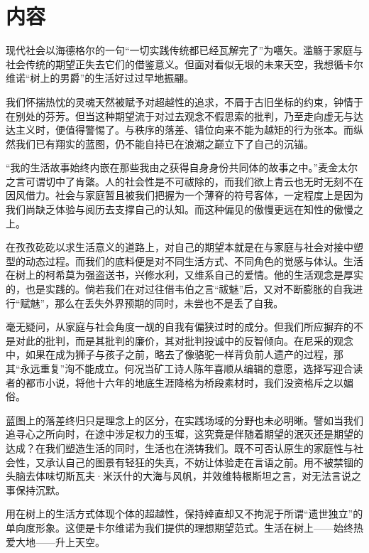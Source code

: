 \documentclass{cv}
\begin{document}
\section[\faTree]{内容}

现代社会以海德格尔的一句“一切实践传统都已经瓦解完了”为嚆矢。滥觞于家庭与社会传统的期望正失去它们的借鉴意义。但面对看似无垠的未来天空，我想循卡尔维诺“树上的男爵”的生活好过过早地振翮。

我们怀揣热忱的灵魂天然被赋予对超越性的追求，不屑于古旧坐标的约束，钟情于在别处的芬芳。但当这种期望流于对过去观念不假思索的批判，乃至走向虚无与达达主义时，便值得警惕了。与秩序的落差、错位向来不能为越矩的行为张本。而纵然我们已有翔实的蓝图，仍不能自持已在浪潮之巅立下了自己的沉锚。

“我的生活故事始终内嵌在那些我由之获得自身身份共同体的故事之中。”麦金太尔之言可谓切中了肯綮。人的社会性是不可祓除的，而我们欲上青云也无时无刻不在因风借力。社会与家庭暂且被我们把握为一个薄脊的符号客体，一定程度上是因为我们尚缺乏体验与阅历去支撑自己的认知。而这种偏见的傲慢更远在知性的傲慢之上。

在孜孜矻矻以求生活意义的道路上，对自己的期望本就是在与家庭与社会对接中塑型的动态过程。而我们的底料便是对不同生活方式、不同角色的觉感与体认。生活在树上的柯希莫为强盗送书，兴修水利，又维系自己的爱情。他的生活观念是厚实的，也是实践的。倘若我们在对过往借韦伯之言“祓魅”后，又对不断膨胀的自我进行“赋魅”，那么在丢失外界预期的同时，未尝也不是丢了自我。

毫无疑问，从家庭与社会角度一觇的自我有偏狭过时的成分。但我们所应摒弃的不是对此的批判，而是其批判的廉价，其对批判投诚中的反智倾向。在尼采的观念中，如果在成为狮子与孩子之前，略去了像骆驼一样背负前人遗产的过程，那其“永远重复”洵不能成立。何况当矿工诗人陈年喜顺从编辑的意愿，选择写迎合读者的都市小说，将他十六年的地底生涯降格为桥段素材时，我们没资格斥之以媚俗。

蓝图上的落差终归只是理念上的区分，在实践场域的分野也未必明晰。譬如当我们追寻心之所向时，在途中涉足权力的玉墀，这究竟是伴随着期望的泯灭还是期望的达成？在我们塑造生活的同时，生活也在浇铸我们。既不可否认原生的家庭性与社会性，又承认自己的图景有轻狂的失真，不妨让体验走在言语之前。用不被禁锢的头脑去体味切斯瓦夫·米沃什的大海与风帆，并效维特根斯坦之言，对无法言说之事保持沉默。

用在树上的生活方式体现个体的超越性，保持婞直却又不拘泥于所谓“遗世独立”的单向度形象。这便是卡尔维诺为我们提供的理想期望范式。生活在树上——始终热爱大地——升上天空。
\end{document}
